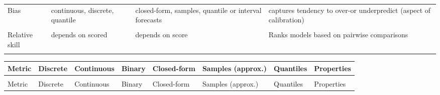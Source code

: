 \documentclass{article}
\begin{document}
\begin{longtable}[t]{>{\raggedright\arraybackslash}p{2.5cm}>{\raggedright\arraybackslash}p{2cm}>{\raggedright\arraybackslash}p{4.5cm}>{\raggedright\arraybackslash}p{4cm}}
\addlinespace
Bias & continuous, discrete, quantile & closed-form, samples, quantile or interval forecasts & captures tendency to over-or underpredict (aspect of calibration)\\
\addlinespace
\cellcolor{gray!6}{Mean score ratio} & \cellcolor{gray!6}{depends on score} & \cellcolor{gray!6}{depends on score} & \cellcolor{gray!6}{compares performance of two models}\\
\addlinespace
Relative skill & depends on scored & depends on score & Ranks models based on pairwise comparisons\\*
\end{longtable}
\begin{landscape}
\begin{longtable}[t]{>{\raggedright\arraybackslash}p{3.2cm}>{\centering\arraybackslash}p{1.5cm}>{\centering\arraybackslash}p{1.5cm}>{\centering\arraybackslash}p{1.3cm}>{\centering\arraybackslash}p{1.3cm}>{\centering\arraybackslash}p{1.5cm}>{\centering\arraybackslash}p{1.3cm}>{\raggedright\arraybackslash}p{6.0cm}}
\toprule
Metric & Discrete & Continuous & Binary & Closed-form & Samples (approx.) & Quantiles & Properties\\
\midrule
\endfirsthead
\multicolumn{8}{@{}l}{\textit{(continued)}}\\
\toprule
Metric & Discrete & Continuous & Binary & Closed-form & Samples (approx.) & Quantiles & Properties\\
\midrule
\endhead


\end{longtable}
\end{landscape}
\end{document}
